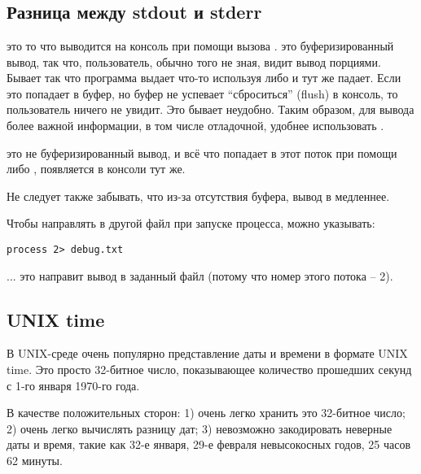 ﻿\chapter{}



\section{Разница между stdout и stderr}

 это то что выводится на консоль при помощи вызова .
 это буферизированный вывод,
так что, пользователь, обычно того не зная, видит вывод порциями. Бывает так что программа выдает
что-то используя  либо  и тут же падает.
Если это попадает в буфер, но буфер не успевает
``сброситься'' (flush) в консоль, то пользователь ничего не увидит. Это бывает неудобно.
Таким образом, для вывода более важной информации, в том числе отладочной, удобнее использовать .

 это не буферизированный вывод, и всё что попадает в этот поток при помощи 
 либо , появляется в консоли тут же.

Не следует также забывать, что из-за отсутствия буфера, вывод в  медленнее.

Чтобы направлять  в другой файл при запуске процесса, можно указывать:

\begin{lstlisting}
process 2> debug.txt
\end{lstlisting}

... это направит вывод  в заданный файл (потому что номер этого потока -- 2).

\section{UNIX time}

В UNIX-среде очень популярно представление даты и времени в формате UNIX time.
Это просто 32-битное число, показывающее
количество прошедших секунд с 1-го января 1970-го года.

В качестве положительных сторон: 1) очень легко хранить это 32-битное число; 2) очень легко вычислять разницу дат;
3) невозможно закодировать неверные даты и время, такие как 32-е января, 29-е февраля невысокосных годов, 
25 часов 62 минуты.

